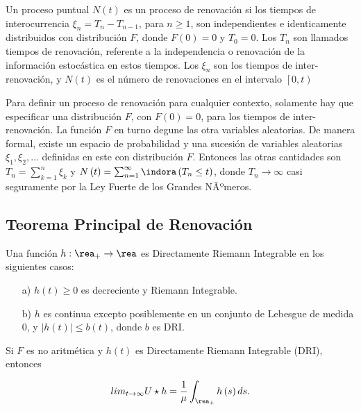 \begin{Def}
Un proceso puntual $N\left(t\right)$ es un proceso de renovaci\'on si los tiempos de interocurrencia $\xi_{n}=T_{n}-T_{n-1}$, para $n\geq1$, son independientes e identicamente distribuidos con distribuci\'on $F$, donde $F\left(0\right)=0$ y $T_{0}=0$. Los $T_{n}$ son llamados tiempos de renovaci\'on, referente a la independencia o renovaci\'on de la informaci\'on estoc\'astica en estos tiempos. Los $\xi_{n}$ son los tiempos de inter-renovaci\'on, y $N\left(t\right)$ es el n\'umero de renovaciones en el intervalo $\left[0,t\right)$
\end{Def}


\begin{Note}
Para definir un proceso de renovaci\'on para cualquier contexto, solamente hay que especificar una distribuci\'on $F$, con $F\left(0\right)=0$, para los tiempos de inter-renovaci\'on. La funci\'on $F$ en turno degune las otra variables aleatorias. De manera formal, existe un espacio de probabilidad y una sucesi\'on de variables aleatorias $\xi_{1},\xi_{2},\ldots$ definidas en este con distribuci\'on $F$. Entonces las otras cantidades son $T_{n}=\sum_{k=1}^{n}\xi_{k}$ y $N\left(t\right)=\sum_{n=1}^{\infty}\indora\left(T_{n}\leq t\right)$, donde $T_{n}\rightarrow\infty$ casi seguramente por la Ley Fuerte de los Grandes NÃºmeros.
\end{Note}

%
\subsection{Teorema Principal de Renovaci\'on}
%

\begin{Note} Una funci\'on $h:\rea_{+}\rightarrow\rea$ es Directamente Riemann Integrable en los siguientes casos:
\begin{itemize}
\item[a)] $h\left(t\right)\geq0$ es decreciente y Riemann Integrable.
\item[b)] $h$ es continua excepto posiblemente en un conjunto de Lebesgue de medida 0, y $|h\left(t\right)|\leq b\left(t\right)$, donde $b$ es DRI.
\end{itemize}
\end{Note}

\begin{Teo}
Si $F$ es no aritm\'etica y $h\left(t\right)$ es Directamente Riemann Integrable (DRI), entonces

\begin{eqnarray*}
lim_{t\rightarrow\infty}U\star h=\frac{1}{\mu}\int_{\rea_{+}}h\left(s\right)ds.
\end{eqnarray*}
\end{Teo}

